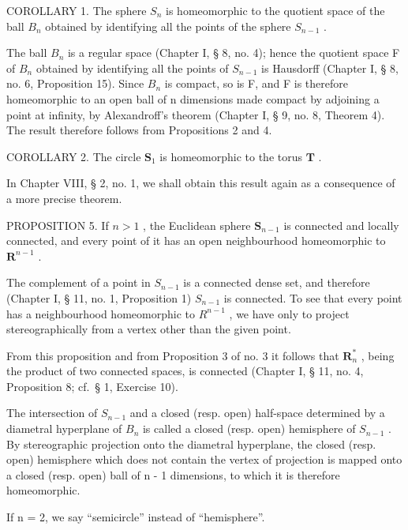 COROLLARY 1. The sphere \(S_{n}\) is homeomorphic to the quotient space of the ball \(B_{n}\) obtained by identifying all the points of the sphere \(S_{n-1}\) .

The ball \(B_{n}\) is a regular space (Chapter I, § 8, no. 4); hence the quotient space F of \(B_{n}\) obtained by identifying all the points of \(S_{n-1}\) is Hausdorff (Chapter I, § 8, no. 6, Proposition 15). Since \(B_{n}\) is compact, so is F, and F is therefore homeomorphic to an open ball of n dimensions made compact by adjoining a point at infinity, by Alexandroff's theorem (Chapter I, § 9, no. 8, Theorem 4). The result therefore follows from Propositions 2 and 4.

COROLLARY 2. The circle \(\mathbf{S}_1\) is homeomorphic to the torus \(\mathbf{T}\) .

In Chapter VIII, § 2, no. 1, we shall obtain this result again as a consequence of a more precise theorem.

PROPOSITION 5. If \(n > 1\) , the Euclidean sphere \(\mathbf{S}_{n-1}\) is connected and locally connected, and every point of it has an open neighbourhood homeomorphic to \(\mathbf{R}^{n-1}\) .

The complement of a point in \(S_{n-1}\) is a connected dense set, and therefore (Chapter I, § 11, no. 1, Proposition 1) \(S_{n-1}\) is connected. To see that every point has a neighbourhood homeomorphic to \(R^{n-1}\) , we have only to project stereographically from a vertex other than the given point.

From this proposition and from Proposition 3 of no. 3 it follows that \(\mathbf{R}_n^*\) , being the product of two connected spaces, is connected (Chapter I, § 11, no. 4, Proposition 8; cf.~§ 1, Exercise 10).

The intersection of \(S_{n-1}\) and a closed (resp. open) half-space determined by a diametral hyperplane of \(B_{n}\) is called a closed (resp. open) hemisphere of \(S_{n-1}\) . By stereographic projection onto the diametral hyperplane, the closed (resp. open) hemisphere which does not contain the vertex of projection is mapped onto a closed (resp. open) ball of n - 1 dimensions, to which it is therefore homeomorphic.

If n = 2, we say ``semicircle'' instead of ``hemisphere''.

